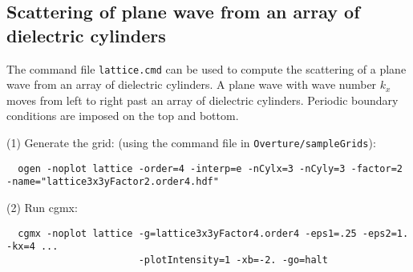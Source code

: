 \clearpage
\subsection{Scattering of plane wave from an array of dielectric cylinders} \label{sec:dielectricCylArray}

The command file {\tt lattice.cmd} can be used to compute the scattering
of a plane wave from an array of dielectric cylinders. A plane wave with wave number $k_x$ 
moves from left to right past an
array of dielectric cylinders. Periodic boundary conditions are imposed on the top and bottom. 


\noindent (1) Generate the grid: (using the command file in {\tt Overture/sampleGrids}):
{\small
\begin{verbatim}
  ogen -noplot lattice -order=4 -interp=e -nCylx=3 -nCyly=3 -factor=2 -name="lattice3x3yFactor2.order4.hdf"
\end{verbatim}
}
\noindent (2) Run cgmx: 
\begin{verbatim}
  cgmx -noplot lattice -g=lattice3x3yFactor4.order4 -eps1=.25 -eps2=1. -kx=4 ...
                       -plotIntensity=1 -xb=-2. -go=halt
\end{verbatim}

